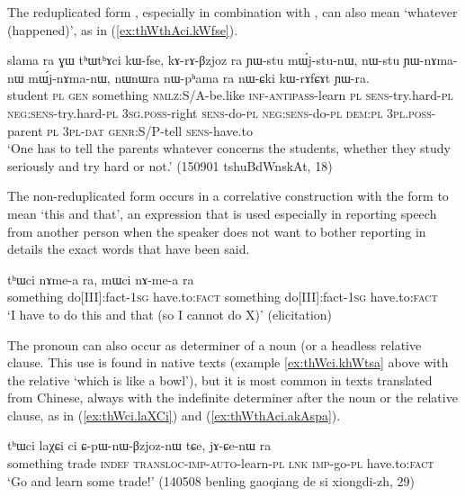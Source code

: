 The reduplicated form , especially in combination with , can also mean `whatever (happened)', as in (\ref{ex:thWthAci.kWfse}).
 
 \begin{exe}
\ex \label{ex:thWthAci.kWfse}
\gll  slama ra ɣɯ tʰɯtʰɤci kɯ-fse, kɤ-rɤ-βzjoz ra ɲɯ-stu mɯ́j-stu-nɯ, nɯ-stu ɲɯ-nɤma-nɯ mɯ́j-nɤma-nɯ,  nɯnɯra nɯ-pʰama ra nɯ-ɕki kɯ-rɤfɕɤt ɲɯ-ra. \\
student \textsc{pl} \textsc{gen} something \textsc{nmlz}:S/A-be.like \textsc{inf-antipass}-learn \textsc{pl} \textsc{sens}-try.hard-\textsc{pl} \textsc{neg:sens}-try.hard-\textsc{pl} \textsc{3sg.poss}-right \textsc{sens}-do-\textsc{pl} \textsc{neg:sens}-do-\textsc{pl} \textsc{dem:pl} \textsc{3pl.poss}-parent \textsc{pl} \textsc{3pl-dat} \textsc{genr}:S/P-tell \textsc{sens}-have.to \\
\glt `One has to tell the parents whatever concerns the students, whether they study seriously and try hard or not.'   (150901 tshuBdWnskAt, 18)
 \end{exe}
  
The non-reduplicated form  occurs in a correlative construction with the form  to mean `this and that', an expression that is used especially in reporting speech from another person when the speaker does not want to bother reporting in details the exact words that have been said.

\begin{exe}
\ex \label{ex:thWci.mWci}
\gll 
tʰɯci nɤme-a ra, mɯci nɤ-me-a ra \\
something do[III]:fact-\textsc{1sg} have.to:\textsc{fact} something do[III]:fact-\textsc{1sg} have.to:\textsc{fact} \\
\glt `I have to do this and that (so I cannot do X)' (elicitation)
 \end{exe}
 
The pronoun   can also occur as determiner of a noun (or a headless relative clause. This use is found in native texts (example \ref{ex:thWci.khWtsa} above with the relative  `which is like a bowl'), but it is most common in texts translated from Chinese, always with the indefinite determiner  after the noun or the relative clause, as in (\ref{ex:thWci.laXCi}) and (\ref{ex:thWthAci.akAspa}). 

\begin{exe}
\ex \label{ex:thWci.laXCi}
\gll   tʰɯci laχɕi ci ɕ-pɯ-nɯ-βzjoz-nɯ tɕe, jɤ-ɕe-nɯ ra \\
something trade \textsc{indef} \textsc{transloc-imp-auto}-learn-\textsc{pl} \textsc{lnk} \textsc{imp}-go-\textsc{pl} have.to:\textsc{fact} \\
\glt `Go and learn some trade!' (140508 benling gaoqiang de si xiongdi-zh, 29)
 \end{exe}

